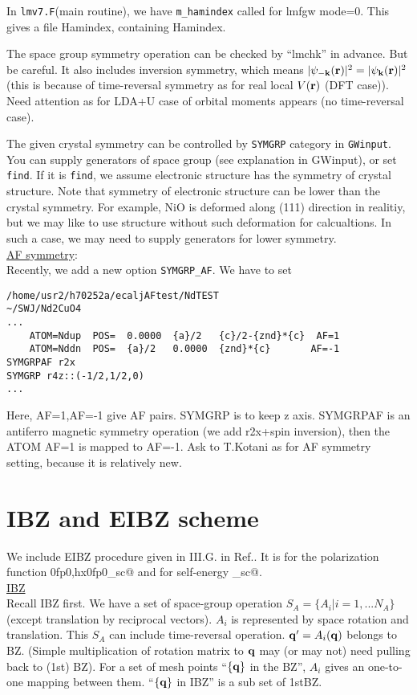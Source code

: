 \documentclass[a4paper,10pt,fleqn]{article}
\newcommand{\bfq}{{\bf q}}
\newcommand{\bfk}{{\bf k}}
\newcommand{\bfr}{{\bf r}}
\begin{document}
In \verb#lmv7.F#(main routine), we have \verb#m_hamindex# called for lmfgw mode=0.
This gives a file Hamindex, containing Hamindex.


The space group symmetry operation can be checked by 
``lmchk'' in advance. But be careful. It also includes inversion symmetry,
which means $|\psi_{-\bfk}(\bfr)|^2=|\psi_\bfk(\bfr)|^2$
(this is because of time-reversal symmetry as for real local $V(\bfr)$ (DFT case)).
Need attention as for LDA+U case of orbital moments appears (no time-reversal case).

The given crystal symmetry can be controlled by \verb#SYMGRP# category
in \verb#GWinput#. You can supply generators of space group (see
explanation in GWinput), or set \verb#find#. If it is \verb#find#,
we assume electronic structure has the symmetry of crystal structure.
Note that symmetry of electronic structure can be lower than the crystal symmetry.
For example, NiO is deformed along (111) direction in realitiy,
but we may like to use structure without such deformation for calcualtions.
In such a case, we may need to supply generators for lower symmetry.\\

\noindent \underline{AF symmetry}:\\
Recently, we add a new option \verb#SYMGRP_AF#.
We have to set 
\begin{verbatim}
/home/usr2/h70252a/ecaljAFtest/NdTEST
~/SWJ/Nd2CuO4
...
    ATOM=Ndup  POS=  0.0000  {a}/2   {c}/2-{znd}*{c}  AF=1
    ATOM=Nddn  POS=  {a}/2   0.0000  {znd}*{c}       AF=-1
SYMGRPAF r2x
SYMGRP r4z::(-1/2,1/2,0) 
...
\end{verbatim}
Here, AF=1,AF=-1 give AF pairs. 
SYMGRP is to keep z axis. SYMGRPAF is an antiferro magnetic symmetry operation 
(we add r2x+spin inversion), then the ATOM AF=1 is mapped to AF=-1.
Ask to T.Kotani as for AF symmetry setting, because it is relatively new.


\section{IBZ and EIBZ scheme}
We include EIBZ procedure given in III.G. in Ref.\cite{friedrich_efficient_2010}.
It is for the polarization function \verb@hx0fp0,hx0fp0_sc@ and
for self-energy _sc@.\\

\noindent \underline{IBZ}\\
Recall IBZ first. We have a set of space-group operation
$S_A=\{A_i |i=1,... N_A\}$  (except translation by reciprocal vectors). 
$A_i$ is represented by space rotation and translation.
This $S_A$ can include time-reversal operation. $\bfq'=A_i(\bfq)$ belongs to BZ.
(Simple multiplication of rotation matrix to $\bfq$ may (or may not) need pulling back to (1st) BZ).
For a set of mesh points ``$\{\bfq\}$ in the BZ'', $A_i$ gives an one-to-one mapping between them.
``$\{\bfq\}$ in IBZ'' is a sub set of 1stBZ.
\end{document}

